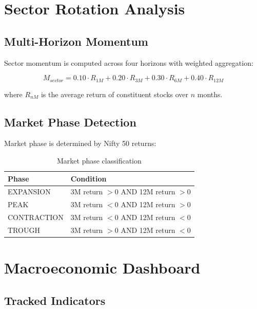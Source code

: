 \documentclass[12pt, a4paper, oneside]{report}
\begin{document}
\section{Sector Rotation Analysis}
\label{sec:meth_sector}

\subsection{Multi-Horizon Momentum}

Sector momentum is computed across four horizons with weighted aggregation:

\begin{equation}
    M_{sector} = 0.10 \cdot R_{1M} + 0.20 \cdot R_{3M} + 0.30 \cdot R_{6M} + 0.40 \cdot R_{12M}
\end{equation}

where $R_{nM}$ is the average return of constituent stocks over $n$ months.

\subsection{Market Phase Detection}

Market phase is determined by Nifty 50 returns:
\begin{table}[H]
\centering
\caption{Market phase classification}
\label{tab:market_phase}
\begin{tabular}{@{}ll@{}}
\toprule
\textbf{Phase} & \textbf{Condition} \\
\midrule
EXPANSION & 3M return $> 0$ AND 12M return $> 0$ \\
PEAK & 3M return $< 0$ AND 12M return $> 0$ \\
CONTRACTION & 3M return $< 0$ AND 12M return $< 0$ \\
TROUGH & 3M return $> 0$ AND 12M return $< 0$ \\
\bottomrule
\end{tabular}
\end{table}

\section{Macroeconomic Dashboard}
\label{sec:meth_macro}

\subsection{Tracked Indicators}
\end{document}
